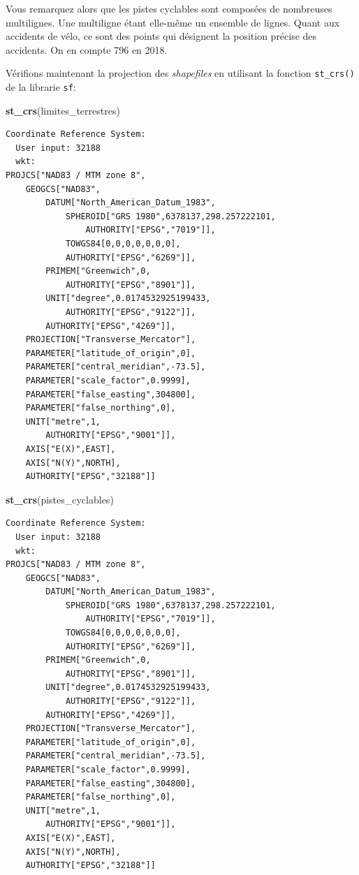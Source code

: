 \documentclass[
  12pt,
]{krantz}
\newenvironment{Shaded}{\begin{snugshade}}{\end{snugshade}}
\newcommand{\KeywordTok}[1]{\textcolor[rgb]{0.13,0.29,0.53}{\textbf{#1}}}
\newcommand{\NormalTok}[1]{#1}
\begin{document}
Vous remarquez alors que les pistes cyclables sont composées de nombreuses multilignes. Une multiligne étant elle-même un ensemble de lignes.
Quant aux accidents de vélo, ce sont des points qui désignent la position précise des accidents. On en compte 796 en 2018.

Vérifions maintenant la projection des \emph{shapefiles} en utilisant la fonction \texttt{st\_crs()} de la librarie \texttt{sf}:

\begin{Shaded}
\begin{Highlighting}[]
\KeywordTok{st_crs}\NormalTok{(limites_terrestres)}
\end{Highlighting}
\end{Shaded}

\begin{verbatim}
Coordinate Reference System:
  User input: 32188 
  wkt:
PROJCS["NAD83 / MTM zone 8",
    GEOGCS["NAD83",
        DATUM["North_American_Datum_1983",
            SPHEROID["GRS 1980",6378137,298.257222101,
                AUTHORITY["EPSG","7019"]],
            TOWGS84[0,0,0,0,0,0,0],
            AUTHORITY["EPSG","6269"]],
        PRIMEM["Greenwich",0,
            AUTHORITY["EPSG","8901"]],
        UNIT["degree",0.0174532925199433,
            AUTHORITY["EPSG","9122"]],
        AUTHORITY["EPSG","4269"]],
    PROJECTION["Transverse_Mercator"],
    PARAMETER["latitude_of_origin",0],
    PARAMETER["central_meridian",-73.5],
    PARAMETER["scale_factor",0.9999],
    PARAMETER["false_easting",304800],
    PARAMETER["false_northing",0],
    UNIT["metre",1,
        AUTHORITY["EPSG","9001"]],
    AXIS["E(X)",EAST],
    AXIS["N(Y)",NORTH],
    AUTHORITY["EPSG","32188"]]
\end{verbatim}

\begin{Shaded}
\begin{Highlighting}[]
\KeywordTok{st_crs}\NormalTok{(pistes_cyclables)}
\end{Highlighting}
\end{Shaded}

\begin{verbatim}
Coordinate Reference System:
  User input: 32188 
  wkt:
PROJCS["NAD83 / MTM zone 8",
    GEOGCS["NAD83",
        DATUM["North_American_Datum_1983",
            SPHEROID["GRS 1980",6378137,298.257222101,
                AUTHORITY["EPSG","7019"]],
            TOWGS84[0,0,0,0,0,0,0],
            AUTHORITY["EPSG","6269"]],
        PRIMEM["Greenwich",0,
            AUTHORITY["EPSG","8901"]],
        UNIT["degree",0.0174532925199433,
            AUTHORITY["EPSG","9122"]],
        AUTHORITY["EPSG","4269"]],
    PROJECTION["Transverse_Mercator"],
    PARAMETER["latitude_of_origin",0],
    PARAMETER["central_meridian",-73.5],
    PARAMETER["scale_factor",0.9999],
    PARAMETER["false_easting",304800],
    PARAMETER["false_northing",0],
    UNIT["metre",1,
        AUTHORITY["EPSG","9001"]],
    AXIS["E(X)",EAST],
    AXIS["N(Y)",NORTH],
    AUTHORITY["EPSG","32188"]]
\end{verbatim}
\end{document}
